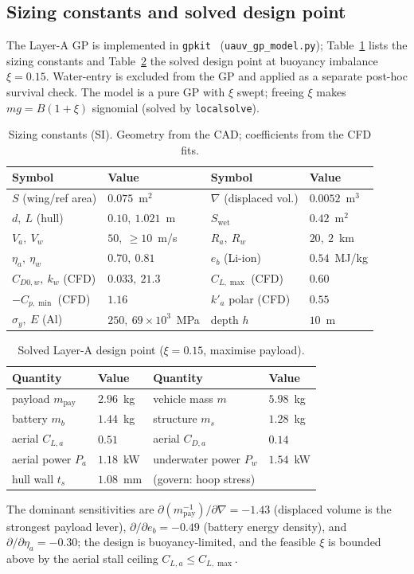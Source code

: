 \documentclass{new-aiaa}
\begin{document}
\subsection{Sizing constants and solved design point}
The Layer-A GP is implemented in \texttt{gpkit}~\cite{hoburg2014geometric} (\texttt{uauv\_gp\_model.py});
Table~\ref{tab:const} lists the sizing constants and Table~\ref{tab:soln} the solved design point at
buoyancy imbalance $\xi=0.15$. Water-entry is excluded from the GP and applied as a separate
post-hoc survival check. The model is a pure GP with $\xi$ swept; freeing $\xi$ makes
$mg=B(1+\xi)$ signomial (solved by \texttt{localsolve}).
\begin{table}[h]\centering
\caption{Sizing constants (SI). Geometry from the CAD; coefficients from the CFD fits.}\label{tab:const}
\small
\begin{tabular}{@{}llll@{}}\toprule
Symbol & Value & Symbol & Value \\\midrule
$S$ (wing/ref area) & $0.075$~m$^2$ & $\nabla$ (displaced vol.) & $0.0052$~m$^3$ \\
$d,\ L$ (hull) & $0.10,\ 1.021$~m & $S_{\text{wet}}$ & $0.42$~m$^2$ \\
$V_a,\ V_w$ & $50,\ \ge10$~m/s & $R_a,\ R_w$ & $20,\ 2$~km \\
$\eta_a,\ \eta_w$ & $0.70,\ 0.81$ & $e_b$ (Li-ion) & $0.54$~MJ/kg \\
$C_{D0,w},\ k_w$ (CFD) & $0.033,\ 21.3$ & $C_{L,\max}$ (CFD) & $0.60$ \\
$-C_{p,\min}$ (CFD) & $1.16$ & $k'_a$ polar (CFD) & $0.55$ \\
$\sigma_y,\ E$ (Al) & $250,\ 69{\times}10^3$~MPa & depth $h$ & $10$~m \\\bottomrule
\end{tabular}
\end{table}
\begin{table}[h]\centering
\caption{Solved Layer-A design point ($\xi=0.15$, maximise payload).}\label{tab:soln}
\small
\begin{tabular}{@{}llll@{}}\toprule
Quantity & Value & Quantity & Value \\\midrule
payload $m_{\text{pay}}$ & $2.96$~kg & vehicle mass $m$ & $5.98$~kg \\
battery $m_b$ & $1.44$~kg & structure $m_s$ & $1.28$~kg \\
aerial $C_{L,a}$ & $0.51$ & aerial $C_{D,a}$ & $0.14$ \\
aerial power $P_a$ & $1.18$~kW & underwater power $P_w$ & $1.54$~kW \\
hull wall $t_s$ & $1.08$~mm & (govern: hoop stress) & \\\bottomrule
\end{tabular}
\end{table}
The dominant sensitivities are $\partial(m_{\text{pay}}^{-1})/\partial\nabla=-1.43$ (displaced volume
is the strongest payload lever), $\partial/\partial e_b=-0.49$ (battery energy density), and
$\partial/\partial\eta_a=-0.30$; the design is buoyancy-limited, and the feasible $\xi$ is bounded
above by the aerial stall ceiling $C_{L,a}\le C_{L,\max}$.
\end{document}
